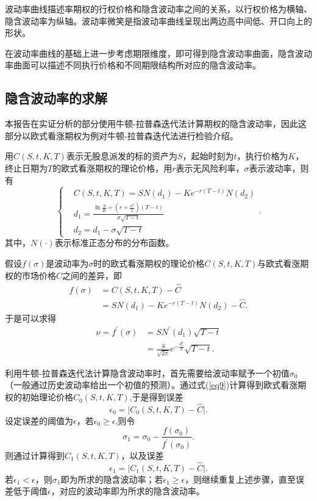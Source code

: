 波动率曲线描述率期权的行权价格和隐含波动率之间的关系，以行权价格为横轴、隐含波动率为纵轴。波动率微笑是指波动率曲线呈现出两边高中间低、开口向上的形状。

在波动率曲线的基础上进一步考虑期限维度，即可得到隐含波动率曲面，隐含波动率曲面可以描述不同执行价格和不同期限结构所对应的隐含波动率。

\subsection{隐含波动率的求解}
本报告在实证分析的部分使用牛顿-拉普森迭代法计算期权的隐含波动率，因此这部分以欧式看涨期权为例对牛顿-拉普森迭代法进行检验介绍。

用$C(S,t,K,T)$表示无股息派发的标的资产为$S$，起始时刻为$t$，执行价格为$K$，终止日期为$T$的欧式看涨期权的理论价格，用$r$表示无风险利率，$\sigma$表示波动率，则有
\begin{equation}
	\label{eq9}
	\left\{
	\begin{aligned}
		&C(S,t,K,T) = SN(d_1)-Ke^{-r(T-t)}N(d_2) \\
		& d_1 = \frac{\ln \frac{S}{K}+\left(r+\frac{\sigma^2}{2}\right)(T-t)}{\sigma\sqrt{T-t}} \\
		& d_2 = d_1 - \sigma\sqrt{T-t} 
	\end{aligned}
	\right. .
\end{equation}
其中，$N(\cdot)$表示标准正态分布的分布函数。

假设$f(\sigma)$是波动率为$\sigma$时的欧式看涨期权的理论价格$C(S,t,K,T)$与欧式看涨期权的市场价格$\hat{C}$之间的差异，即
\begin{align}
	f(\sigma) &= C(S,t,K,T)-\hat{C} \nonumber\\
	& = SN(d_1)-Ke^{-r(T-t)}N(d_2)-\hat{C} .\nonumber
\end{align}
于是可以求得
\begin{align}
	\nu = f^{'}(\sigma) &= SN^{'}(d_1)\sqrt{T-t}  \nonumber\\
	& = \frac{S}{\sqrt{2\pi}}e^{-\frac{d_1^2}{2}}\sqrt{T-t}.\nonumber
\end{align}

利用牛顿-拉普森迭代法计算隐含波动率时，首先需要给波动率赋予一个初值$\sigma_0$（一般通过历史波动率给出一个初值的预测）。通过式(\ref{eq9})计算得到欧式看涨期权的初始理论价格$C_0(S,t,K,T)$,于是得到误差
$$\epsilon_0 = \vert C_0(S,t,K,T) -\hat{C}\vert. $$
设定误差的阈值为$\epsilon$，若$\epsilon_0 \ge \epsilon$,则令
$$\sigma_1  = \sigma_0 - \frac{f(\sigma_0)}{f^{'}(\sigma_0)}.$$
则通过计算得到$C_1(S,t,K,T)$，以及误差
$$\epsilon_1 = \vert C_1(S,t,K,T) -\hat{C}\vert. $$
若$\epsilon_1<\epsilon$，则$\sigma_1$即为所求的隐含波动率；若$\epsilon_1\ge \epsilon$，则继续重复上述步骤，直至误差低于阈值$\epsilon$，对应的波动率即为所求的隐含波动率。
